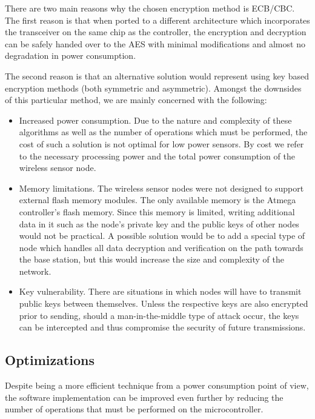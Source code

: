 There are two main reasons why the chosen encryption method is ECB/CBC. The first 
reason is that when ported to a different architecture which incorporates the 
transceiver on the same chip as the controller, the encryption and decryption can be safely 
handed over to the AES with minimal modifications and almost no degradation in 
power consumption.

The second reason is that an alternative solution would represent using key based 
encryption methods (both symmetric and asymmetric). Amongst the downsides of this 
particular method, we are mainly concerned with the following:

\begin{itemize}

\item Increased power consumption. Due to the nature and complexity of these algorithms 
as well as the number of operations which must be performed, the cost of such a 
solution is not optimal for low power sensors. By cost we refer to the necessary 
processing power and the total power consumption of the wireless sensor node.
\item Memory limitations. The wireless sensor nodes were not designed to support 
external flash memory modules. The only available memory is the Atmega controller's 
flash memory. Since this memory is limited, writing additional data in it such as 
the node's private key and the public keys of other nodes would not be practical.
A possible solution would be to add a special type of node which handles all data 
decryption and verification on the path towards the base station, but this would 
increase the size and complexity of the network.
\item Key vulnerability. There are situations in which nodes will have to transmit 
public keys between themselves. Unless the respective keys are also encrypted prior 
to sending, should a man-in-the-middle type of attack occur, the keys can be intercepted 
and thus compromise the security of future transmissions.

\end{itemize}

\subsection{Optimizations}

Despite being a more efficient technique from a power consumption point of view, the 
software implementation can be improved even further by reducing the number of operations 
that must be performed on the microcontroller.

